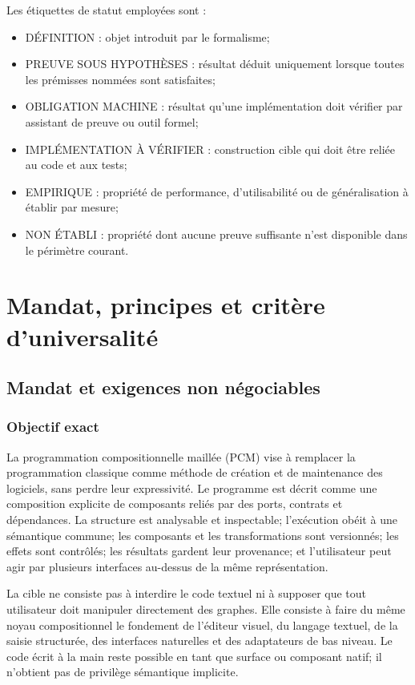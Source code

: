 \documentclass[11pt,a4paper,openany]{book}
\newcommand{\kw}[1]{\textsf{#1}}
\theoremstyle{definition}
\theoremstyle{plain}
\theoremstyle{remark}
\begin{document}
Les étiquettes de statut employées sont :
\begin{itemize}
\item \kw{DÉFINITION} : objet introduit par le formalisme;
\item \kw{PREUVE SOUS HYPOTHÈSES} : résultat déduit uniquement lorsque toutes les prémisses nommées sont satisfaites;
\item \kw{OBLIGATION MACHINE} : résultat qu'une implémentation doit vérifier par assistant de preuve ou outil formel;
\item \kw{IMPLÉMENTATION À VÉRIFIER} : construction cible qui doit être reliée au code et aux tests;
\item \kw{EMPIRIQUE} : propriété de performance, d'utilisabilité ou de généralisation à établir par mesure;
\item \kw{NON ÉTABLI} : propriété dont aucune preuve suffisante n'est disponible dans le périmètre courant.
\end{itemize}
\tableofcontents
\mainmatter

\part{Mandat, principes et critère d'universalité}
\chapter{Mandat et exigences non négociables}
\section{Objectif exact}
La programmation compositionnelle maillée (PCM) vise à remplacer la programmation classique comme méthode de création et de maintenance des logiciels, sans perdre leur expressivité. Le programme est décrit comme une composition explicite de composants reliés par des ports, contrats et dépendances. La structure est analysable et inspectable; l'exécution obéit à une sémantique commune; les composants et les transformations sont versionnés; les effets sont contrôlés; les résultats gardent leur provenance; et l'utilisateur peut agir par plusieurs interfaces au-dessus de la même représentation.

La cible ne consiste pas à interdire le code textuel ni à supposer que tout utilisateur doit manipuler directement des graphes. Elle consiste à faire du même noyau compositionnel le fondement de l'éditeur visuel, du langage textuel, de la saisie structurée, des interfaces naturelles et des adaptateurs de bas niveau. Le code écrit à la main reste possible en tant que surface ou composant natif; il n'obtient pas de privilège sémantique implicite.
\end{document}
